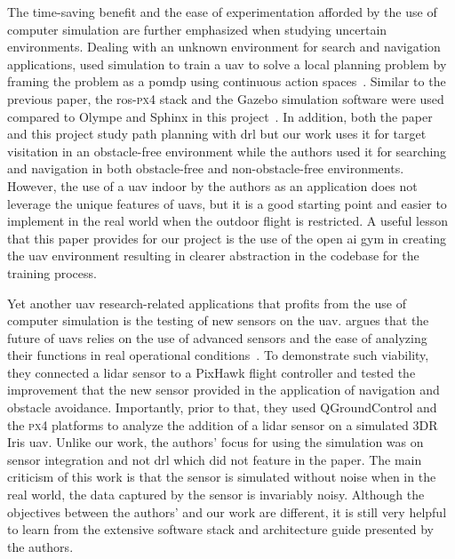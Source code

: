 \documentclass[../main.tex]{subfiles}
\begin{document}
	The time-saving benefit and the ease of experimentation 
	afforded by the use of computer simulation are further emphasized 
	when studying uncertain environments.
	Dealing with an unknown environment for search and navigation applications,
	\citeauthor{Wal19} used simulation to train a \gls{uav}
	to solve a local planning problem
	by framing the problem as 
	a \gls{pomdp}
	using continuous action spaces~\cite{Wal19}.
	Similar to the previous paper, the \gls{ros}-\textsc{px4} stack 
	and the Gazebo 
	simulation software were used compared to Olympe and Sphinx 
	in this project~\cite{Wal19}.
	In addition, both the paper and this project study path planning 
	with \gls{drl} but our work uses it for target visitation 
	in an obstacle-free environment 
	while the authors used it for searching and navigation
	in both obstacle-free and non-obstacle-free environments.
	However, the use of a \gls{uav} indoor by the authors as an application 
	does not leverage the unique features of \glspl{uav}, 
	but it is a good starting point 
	and easier to implement in the real world 
	when the outdoor flight is restricted.
	A useful lesson that this paper provides for our project
	is the use of the open \gls{ai} gym in creating the \gls{uav} environment
	resulting in clearer abstraction in the codebase
	for the training process.
	
	Yet another \gls{uav} research-related applications 
	that profits from the use of computer simulation 
	is the testing of new sensors on the \gls{uav}.
	\citeauthor{Gar20} argues that the future of \glspl{uav}
	relies on the use of advanced sensors and 
	the ease of analyzing their functions
	in real operational conditions~\cite{Gar20}.
	To demonstrate such viability, they connected a \gls{lidar} sensor
	to a PixHawk flight controller and tested the improvement
	that the new sensor provided
	in the application of navigation and obstacle avoidance.
	Importantly, prior to that, they used QGroundControl and the \textsc{px}4
	platforms to analyze the addition of a \gls{lidar} sensor
	on a simulated 3DR Iris \gls{uav}.
	Unlike our work, the authors' focus for using the simulation
	was on sensor integration and not \gls{drl} 
	which did not feature in the paper. 
	The main criticism of this work is that 
	the sensor is simulated without noise
	when in the real world, the data captured
	by the sensor is invariably noisy.
	Although the objectives between the authors' and our work
	are different, it is still very helpful to learn from
	the extensive software stack and architecture guide 
	presented by the authors.
	
\end{document}
